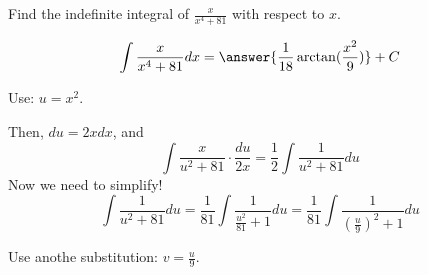 \documentclass{ximera}
\author{Gregory Hartman \and Matthew Carr\and Nela Lakos}
\begin{document}
\begin{exercise}

Find the indefinite integral of $\frac{x}{x^4+81}$ with respect to $x$.

\[
\int \frac{x}{x^4+81} dx=\answer{\frac{1}{18}\arctan(\frac{x^2}{9})}+C
\]
\begin{hint}
Use: $u=x^2$.
\end{hint}

\begin{hint}
Then,  $du=2x dx$, and 
\[
\int \frac{x}{u^2+81}\cdot\frac{du}{2x}=\frac{1}{2}\int \frac{1}{u^2+81} du
\]
Now we need to simplify! 
\[
\int \frac{1}{u^2+81} du=\frac{1}{81}\int \frac{1}{\frac{u^2}{81}+1} du=\frac{1}{81}\int \frac{1}{\left(\frac{u}{9}\right)^2+1} du
\]
\begin{hint}
Use anothe substitution: $v=\frac{u}{9}$.
\end{hint}
\end{hint}
\end{exercise}
\end{document}
